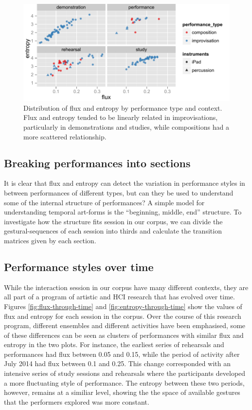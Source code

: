 \documentclass{sigchi}
\begin{document}
\begin{figure}
  \centering
  \includegraphics[width=\linewidth]{figures/flux-entropy-distribution}
  \caption{Distribution of flux and entropy by performance type and
    context. Flux and entropy tended to be linearly related in
    improvisations, particularly in demonstrations and studies, while
    compositions had a more scattered relationship.
    \label{fig:flux-entropy-distribution}}
\end{figure}


\subsection{Breaking performances into sections}

It is clear that flux and entropy can detect the variation in
performance styles in between performances of different types, but can
they be used to understand some of the internal structure of
performances? A simple model for understanding temporal art-forms is
the ``beginning, middle, end'' structure. To investigate how the
structure fits session in our corpus, we can divide the
gestural-sequences of each session into thirds and calculate the
transition matrices given by each section.





\subsection{Performance styles over time}

While the interaction session in our corpus have many different
contexts, they are all part of a program of artistic and HCI research
that has evolved over time. Figures \ref{fig:flux-through-time} and
\ref{fig:entropy-through-time} show the values of flux and entropy for
each session in the corpus. Over the course of this research program,
different ensembles and different activities have been emphasised,
some of these differences can be seen as clusters of performances with
similar flux and entropy in the two plots. For instance, the earliest
series of rehearsals and performances had flux between 0.05 and 0.15,
while the period of activity after July 2014 had flux between 0.1 and
0.25. This change corresponded with an intensive series of study
sessions and rehearsals where the participants developed a more
fluctuating style of performance. The entropy between these two
periods, however, remains at a similiar level, showing the the space
of available gestures that the performers explored was more constant.
\end{document}
